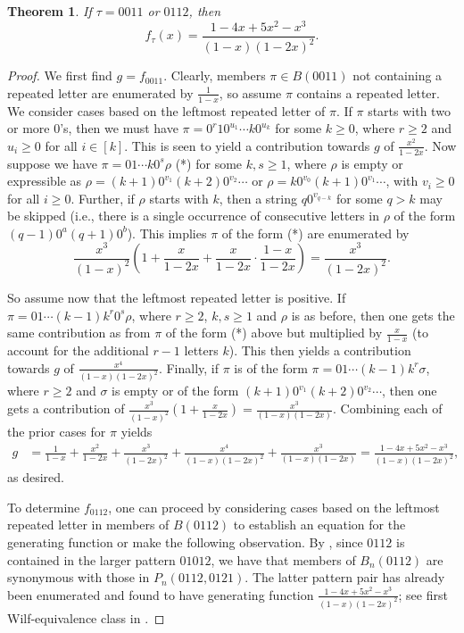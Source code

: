 \documentclass{article}
\theoremstyle{remark}
\theoremstyle{plain}
\newtheorem{theorem}{Theorem}[section]
\begin{document}
\begin{theorem}\label{0011th}
If $\tau=0011$ or $0112$, then
\begin{equation}\label{0011the1}
f_\tau(x)=\frac{1-4x+5x^2-x^3}{(1-x)(1-2x)^2}.
\end{equation}
\end{theorem}
\begin{proof}
We first find $g=f_{0011}$.  Clearly, members $\pi \in B(0011)$ not containing a repeated letter are enumerated by $\frac{1}{1-x}$, so assume $\pi$ contains a repeated letter.  We consider cases based on the leftmost repeated letter of $\pi$. If $\pi$ starts with two or more $0$'s, then we must have $\pi=0^r10^{u_1}\cdots k0^{u_k}$ for some $k \geq 0$, where $r \geq 2$ and $u_i \geq0$ for all $i \in [k]$. This is seen to yield a contribution towards $g$ of $\frac{x^2}{1-2x}$. Now suppose we have $\pi=01\cdots k0^s\rho$ (*) for some $k,s \geq 1$, where $\rho$ is empty or expressible as $\rho=(k+1)0^{v_1}(k+2)0^{v_2}\cdots$ or $\rho=k0^{v_0}(k+1)0^{v_1}\cdots$, with $v_i\geq0$ for all $i\geq0$. Further, if $\rho$ starts with $k$, then a string $q0^{v_{q-k}}$ for some $q>k$ may be skipped (i.e., there is a single occurrence of consecutive letters in $\rho$ of the form $(q-1)0^a(q+1)0^b$).  This implies $\pi$ of the form (*) are enumerated by
$$\frac{x^3}{(1-x)^2}\left(1+\frac{x}{1-2x}+\frac{x}{1-2x}\cdot\frac{1-x}{1-2x}\right)=\frac{x^3}{(1-2x)^2}.$$

So assume now that the leftmost repeated letter is positive.  If $\pi=01\cdots(k-1)k^r0^s\rho$, where $r \geq 2$, $k,s \geq 1$ and $\rho$ is as before, then one gets the same contribution as from $\pi$ of the form (*) above but multiplied by $\frac{x}{1-x}$ (to account for the additional $r-1$ letters $k$).  This then yields a contribution towards $g$ of $\frac{x^4}{(1-x)(1-2x)^2}$.  Finally, if $\pi$ is of the form $\pi=01\cdots(k-1)k^r\sigma$, where $r \geq 2$ and $\sigma$ is empty or of the form $(k+1)0^{v_1}(k+2)0^{v_2}\cdots$, then one gets a contribution of $\frac{x^3}{(1-x)^2}\left(1+\frac{x}{1-2x}\right)=\frac{x^3}{(1-x)(1-2x)}$. Combining each of the prior cases for $\pi$ yields
\begin{align*}
g&=\frac{1}{1-x}+\frac{x^2}{1-2x}+\frac{x^3}{(1-2x)^2}+\frac{x^4}{(1-x)(1-2x)^2}+\frac{x^3}{(1-x)(1-2x)}=\frac{1-4x+5x^2-x^3}{(1-x)(1-2x)^2},
\end{align*}
as desired.

To determine $f_{0112}$, one can proceed  by considering cases based on the leftmost repeated letter in members of $B(0112)$ to establish an equation for the generating function or make the following observation.
By \cite[Lemma 2.4]{DS}, since $0112$ is contained in the larger pattern $01012$, we have that members of $B_n(0112)$ are synonymous with those in $P_n(0112,0121)$.  The latter pattern pair has already been enumerated and found to have generating function $\frac{1-4x+5x^2-x^3}{(1-x)(1-2x)^2}$; see first Wilf-equivalence class in \cite[Section~4.6]{JMS}.
\end{proof}
\end{document}
